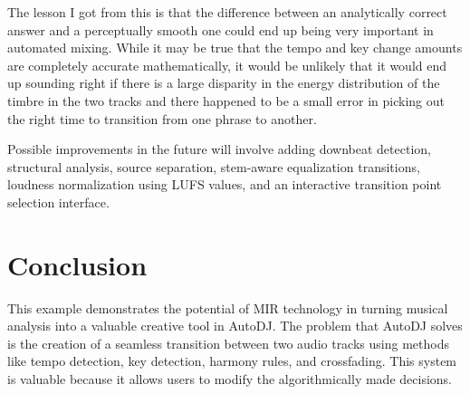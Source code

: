 \documentclass[11pt]{article}
\begin{document}
    The lesson I got from this is that the difference between an analytically correct answer and a perceptually smooth one could end up being very important in automated mixing. While it may be true that the tempo and key change amounts are completely accurate mathematically, it would be unlikely that it would end up sounding right if there is a large disparity in the energy distribution of the timbre in the two tracks and there happened to be a small error in picking out the right time to transition from one phrase to another.

    Possible improvements in the future will involve adding downbeat detection, structural analysis, source separation, stem-aware equalization transitions, loudness normalization using LUFS values, and an interactive transition point selection interface.

    \section{Conclusion}
    This example demonstrates the potential of MIR technology in turning musical analysis into a valuable creative tool in AutoDJ. The problem that AutoDJ solves is the creation of a seamless transition between two audio tracks using methods like tempo detection, key detection, harmony rules, and crossfading. This system is valuable because it allows users to modify the algorithmically made decisions.

    
    
\end{document}
